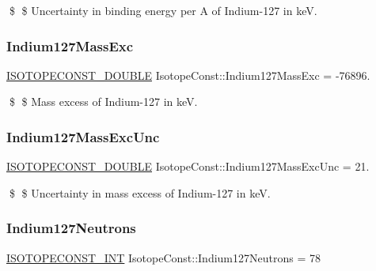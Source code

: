 \$ \$ Uncertainty in binding energy per A of Indium-\/127 in keV. \mbox{\label{group___isotope_const-_indium-_in127_ga612561dfaf242cf5d67462b14c76bc5d}} 
\subsubsection{\texorpdfstring{Indium127\+Mass\+Exc}{Indium127MassExc}}
{\footnotesize\ttfamily \mbox{\hyperlink{group___isotope_const-_macros_ga8f45a7272ce02c0b4c65c44636ed719a}{I\+S\+O\+T\+O\+P\+E\+C\+O\+N\+S\+T\+\_\+\+D\+O\+U\+B\+LE}} Isotope\+Const\+::\+Indium127\+Mass\+Exc = -\/76896.}

\$ \$ Mass excess of Indium-\/127 in keV. \mbox{\label{group___isotope_const-_indium-_in127_gadf3a2dd4f479cc722839efaceec97fb2}} 
\subsubsection{\texorpdfstring{Indium127\+Mass\+Exc\+Unc}{Indium127MassExcUnc}}
{\footnotesize\ttfamily \mbox{\hyperlink{group___isotope_const-_macros_ga8f45a7272ce02c0b4c65c44636ed719a}{I\+S\+O\+T\+O\+P\+E\+C\+O\+N\+S\+T\+\_\+\+D\+O\+U\+B\+LE}} Isotope\+Const\+::\+Indium127\+Mass\+Exc\+Unc = 21.}

\$ \$ Uncertainty in mass excess of Indium-\/127 in keV. \mbox{\label{group___isotope_const-_indium-_in127_ga97e3bd2474066b44fdc6e69656027132}} 
\subsubsection{\texorpdfstring{Indium127\+Neutrons}{Indium127Neutrons}}
{\footnotesize\ttfamily \mbox{\hyperlink{group___isotope_const-_macros_ga5f18360b3e99483a35c32d789e62621c}{I\+S\+O\+T\+O\+P\+E\+C\+O\+N\+S\+T\+\_\+\+I\+NT}} Isotope\+Const\+::\+Indium127\+Neutrons = 78}

